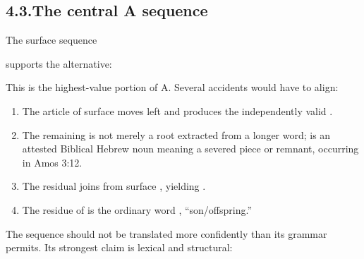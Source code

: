\subsection*{4.3.\quad The central A sequence}

The surface sequence


supports the alternative:


This is the highest-value portion of A.  Several accidents would have to align:

\begin{enumerate}
\item The article  of surface  moves left and produces the independently valid .
\item The remaining  is not merely a root extracted from a longer word;  is an attested Biblical Hebrew noun meaning a severed piece or remnant, occurring in Amos 3:12.\cite{BDB}
\item The residual  joins  from surface , yielding .
\item The residue of  is the ordinary word , ``son/offspring.''
\end{enumerate}

The sequence should not be translated more confidently than its grammar permits.  Its strongest claim is lexical and structural:


